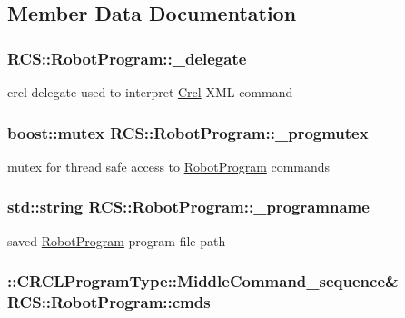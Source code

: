 \subsection{Member Data Documentation}
\hypertarget{classRCS_1_1RobotProgram_addf6e9d586d1fde1aa2b8105268d9e66}{
\subsubsection[{\-\_\-delegate}]{ R\-C\-S\-::\-Robot\-Program\-::\-\_\-delegate}}\label{classRCS_1_1RobotProgram_addf6e9d586d1fde1aa2b8105268d9e66}
crcl delegate used to interpret \hyperlink{namespaceCrcl}{Crcl} X\-M\-L command \hypertarget{classRCS_1_1RobotProgram_ad80469b94591e96c6a221e4769612668}{
\subsubsection[{\-\_\-progmutex}]{\setlength{\rightskip}{0pt plus 5cm}boost\-::mutex R\-C\-S\-::\-Robot\-Program\-::\-\_\-progmutex\hspace{0.3cm}{\ttfamily [static]}}}\label{classRCS_1_1RobotProgram_ad80469b94591e96c6a221e4769612668}
mutex for thread safe access to \hyperlink{classRCS_1_1RobotProgram}{Robot\-Program} commands \hypertarget{classRCS_1_1RobotProgram_aca7d780729e20c6d4e3988883b87527d}{
\subsubsection[{\-\_\-programname}]{\setlength{\rightskip}{0pt plus 5cm}std\-::string R\-C\-S\-::\-Robot\-Program\-::\-\_\-programname}}\label{classRCS_1_1RobotProgram_aca7d780729e20c6d4e3988883b87527d}
saved \hyperlink{classRCS_1_1RobotProgram}{Robot\-Program} program file path \hypertarget{classRCS_1_1RobotProgram_ad6ed8ea72249e836521b2f7d7feb3523}{
\subsubsection[{cmds}]{\setlength{\rightskip}{0pt plus 5cm}\-::C\-R\-C\-L\-Program\-Type\-::\-Middle\-Command\-\_\-sequence\& R\-C\-S\-::\-Robot\-Program\-::cmds}}\label{classRCS_1_1RobotProgram_ad6ed8ea72249e836521b2f7d7feb3523}

